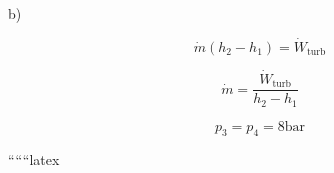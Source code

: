b)

\[
\dot{m}(h_2 - h_1) = \dot{W}_{\text{turb}}
\]

\[
\dot{m} = \frac{\dot{W}_{\text{turb}}}{h_2 - h_1}
\]

\[
p_3 = p_4 = 8 \text{bar}
\]

``````latex